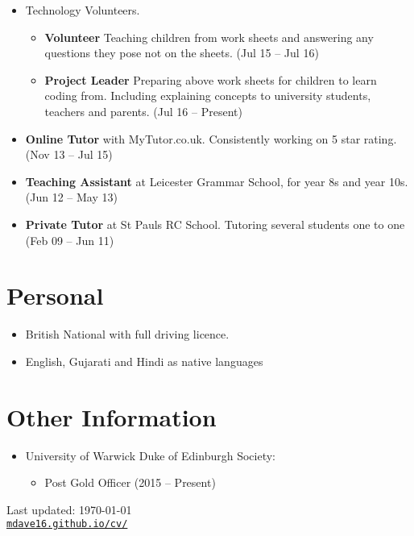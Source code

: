 \documentclass[letterpaper]{article}
\def\footerlink{mdave16.github.io/cv/}
\begin{document}
	\begin{itemize}
		\item Technology Volunteers.
		\begin{itemize}
			\item \textbf{Volunteer} Teaching children from work sheets and answering any questions they pose not on the sheets. (Jul 15 – Jul 16)
			\item \textbf{Project Leader} Preparing above work sheets for children to learn coding from. Including explaining concepts to university students, teachers and parents. (Jul 16 – Present)
		\end{itemize}
	
		\item \textbf{Online Tutor} with MyTutor.co.uk. Consistently working on 5 star rating. (Nov 13 – Jul 15)
		
		\item \textbf{Teaching Assistant} at Leicester Grammar School, for year 8s and year 10s. (Jun 12 – May 13)
		
		\item \textbf{Private Tutor} at St Pauls RC School. Tutoring several students one to one (Feb 09 – Jun 11)
	\end{itemize}
	
	\section*{Personal}
	\begin{itemize}
		\item British National with full driving licence.
		\item English, Gujarati and Hindi as native languages
		
	\end{itemize}
	\section*{Other Information}
	\begin{itemize}
		\item University of Warwick Duke of Edinburgh Society:
		\begin{itemize}
			\item Post Gold Officer (2015 -- Present)
		\end{itemize}
		
	\end{itemize}
	\bigskip
	\begin{center}
		\begin{footnotesize}
			Last updated: \today \\
			\href{\footerlink}{\texttt{\footerlink}}
		\end{footnotesize}
	\end{center}
\end{document}
